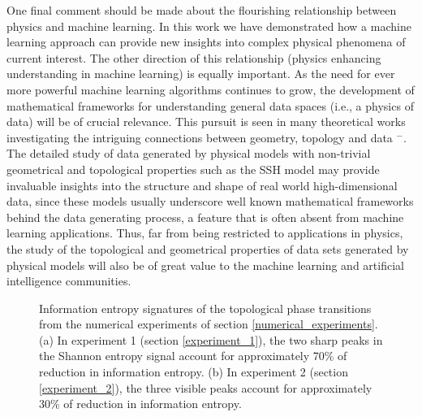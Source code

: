 \documentclass[10pt]{revtex4-1}
\newcommand\SSHOneEntropySignature{./ssh1_plot_feature_importances.png}
\newcommand\SSHTwoEntropySignature{./ssh2_plot_feature_importances.png}
\begin{document}
One final comment should be made about the flourishing relationship between physics and machine learning. In this work we have demonstrated how a machine learning approach can provide new insights into complex physical phenomena of current interest. The other direction of this relationship (physics enhancing understanding in machine learning) is equally important. As the need for ever more powerful machine learning algorithms continues to grow, the development of mathematical frameworks for understanding general data spaces (i.e., a physics of data) will be of crucial relevance. This pursuit is seen in many theoretical works investigating the intriguing connections between geometry, topology and data \cite{carlsson2009topology}$^-$\cite{belkin2003problems}. The detailed study of data generated by physical models with non-trivial geometrical and topological properties such as the SSH model may provide invaluable insights into the structure and shape of real world high-dimensional data, since these models usually underscore well known mathematical frameworks behind the data generating process, a feature that is often absent from machine learning applications. Thus, far from being restricted to applications in physics, the study of the topological and geometrical properties of data sets generated by physical models will also be of great value to the machine learning and artificial intelligence communities.  

\begin{figure}
\centering
{}\quad
{}\quad
\caption{Information entropy signatures of the topological phase transitions from the numerical experiments of section \ref{numerical_experiments}. (a) In experiment 1 (section \ref{experiment_1}), the two sharp peaks in the Shannon entropy signal account for approximately 70\% of reduction in information entropy. (b) In experiment 2 (section \ref{experiment_2}), the three visible peaks account for approximately 30\% of reduction in information entropy.}
\label{feature_importances}
\end{figure}



{}

\end{document}
